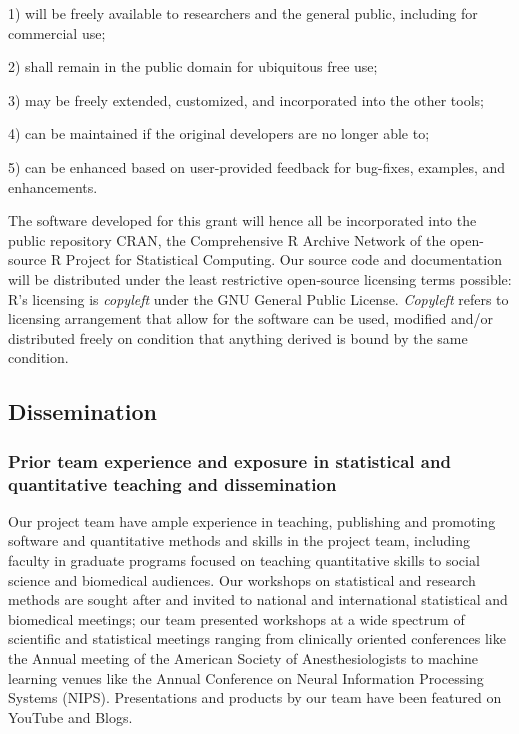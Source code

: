 \documentclass[11pt,notitlepage]{article}
\begin{document}
1) will be freely available to researchers and the general public, including for commercial use; 

2) shall remain in the public domain for ubiquitous free use;

3) may be freely extended, customized, and incorporated into the other tools; 

4) can be maintained if the original developers are no longer able to; 

5) can be enhanced based on user-provided feedback for bug-fixes, examples, and enhancements.

The software developed for this grant will hence all be incorporated into the public repository CRAN, the Comprehensive R Archive Network of the open-source R Project for Statistical Computing. Our source code and documentation will be distributed under the least restrictive open-source licensing terms possible: R's licensing is \textit{copyleft} under the GNU General Public License. \textit{Copyleft} refers to licensing arrangement that allow for the software can be used, modified and/or distributed freely on condition that anything derived is bound by the same condition. 

\subsection*{Dissemination}
\subsubsection*{Prior team experience and exposure in statistical and quantitative teaching and dissemination}
Our project team have ample experience in teaching, publishing and promoting software and quantitative methods and skills in the project team, including faculty in graduate programs focused on teaching quantitative skills to social science and biomedical audiences. Our workshops on statistical and research methods are sought after and invited to national and international statistical and biomedical meetings; our team presented workshops at a wide spectrum of scientific and statistical meetings ranging from clinically oriented conferences like the Annual meeting of the American Society of Anesthesiologists to machine learning venues like the Annual Conference on Neural Information Processing Systems (NIPS). Presentations  and products by our team have been featured on YouTube and Blogs.   
\end{document}
